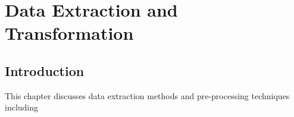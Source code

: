 \chapter{Data Extraction and Transformation}

\section{Introduction}
This chapter discusses data extraction methods and pre-processing techniques including 
